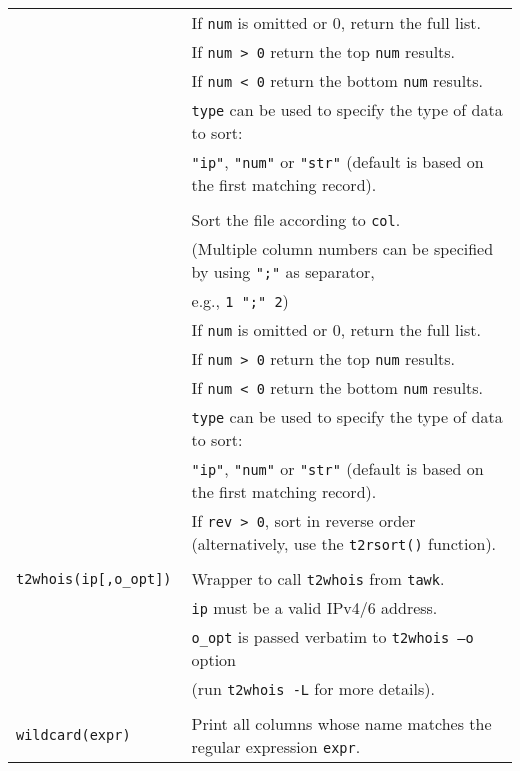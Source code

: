 \documentclass[documentation]{subfiles}
\begin{document}
\begin{longtable}{>{\tt}ll}
                                & If {\tt num} is omitted or 0, return the full list.\\
                                & If {\tt num > 0} return the top {\tt num} results.\\
                                & If {\tt num < 0} return the bottom {\tt num} results.\\
                                & {\tt type} can be used to specify the type of data to sort:\\
                                & {\tt "ip"}, {\tt "num"} or {\tt "str"} (default is based on the first matching record).\\
    \multicolumn{2}{l}{\tt t2sort(col[,num[,type[,rev]]])}\\
                                & Sort the file according to {\tt col}.\\
                                & (Multiple column numbers can be specified by using {\tt ";"} as separator,\\
                                & e.g., {\tt 1 ";" 2})\\
                                & If {\tt num} is omitted or 0, return the full list.\\
                                & If {\tt num > 0} return the top {\tt num} results.\\
                                & If {\tt num < 0} return the bottom {\tt num} results.\\
                                & {\tt type} can be used to specify the type of data to sort:\\
                                & {\tt "ip"}, {\tt "num"} or {\tt "str"} (default is based on the first matching record).\\
                                & If {\tt rev > 0}, sort in reverse order (alternatively, use the {\tt t2rsort()} function).\\
    \\
    t2whois(ip[,o\_opt])        & Wrapper to call {\tt t2whois} from {\tt tawk}.\\
                                & {\tt ip} must be a valid IPv4/6 address.\\
                                & {\tt o\_opt} is passed verbatim to {\tt t2whois --o} option\\
                                & (run {\tt t2whois -L} for more details).\\
    \\
    wildcard(expr)              & Print all columns whose name matches the regular expression {\tt expr}.\\

\end{longtable}
\end{document}
